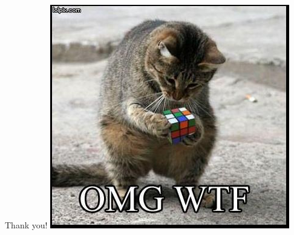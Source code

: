 \documentclass[xcolor=pdftex,dvipsnames,table]{beamer}
\begin{document}
\section{}
\begin{frame}
  \begin{columns}[cc]
    \column{1.5in}
    Thank you!
    \column{1.5in}
    \includegraphics[scale=0.5]{catcube.jpg}
  \end{columns}
\end{frame}
\end{document}
